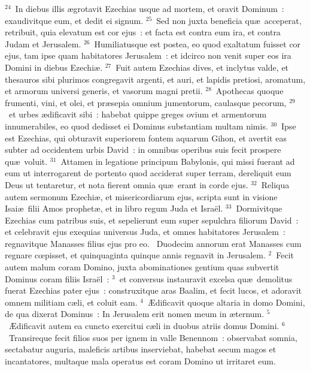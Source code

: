 ${}^{24}$~In diebus illis \ae grotavit Ezechias usque ad mortem, et oravit Dominum~: exaudivitque eum, et dedit ei signum.
${}^{25}$~Sed non juxta beneficia qu\ae\ acceperat, retribuit, quia elevatum est cor ejus~: et facta est contra eum ira, et contra Judam et Jerusalem.
${}^{26}$~Humiliatusque est postea, eo quod exaltatum fuisset cor ejus, tam ipse quam habitatores Jerusalem~: et idcirco non venit super eos ira Domini in diebus Ezechi\ae .
${}^{27}$~Fuit autem Ezechias dives, et inclytus valde, et thesauros sibi plurimos congregavit argenti, et auri, et lapidis pretiosi, aromatum, et armorum universi generis, et vasorum magni pretii.
${}^{28}$~Apothecas quoque frumenti, vini, et olei, et pr\ae sepia omnium jumentorum, caulasque pecorum,
${}^{29}$~et urbes \ae dificavit sibi~: habebat quippe greges ovium et armentorum innumerabiles, eo quod dedisset ei Dominus substantiam multam nimis.
${}^{30}$~Ipse est Ezechias, qui obturavit superiorem fontem aquarum Gihon, et avertit eas subter ad occidentem urbis David~: in omnibus operibus suis fecit prospere qu\ae\ voluit.
${}^{31}$~Attamen in legatione principum Babylonis, qui missi fuerant ad eum ut interrogarent de portento quod acciderat super terram, dereliquit eum Deus ut tentaretur, et nota fierent omnia qu\ae\ erant in corde ejus.
${}^{32}$~Reliqua autem sermonum Ezechi\ae , et misericordiarum ejus, scripta sunt in visione Isai\ae\ filii Amos prophet\ae , et in libro regum Juda et Isra\"el.
${}^{33}$~Dormivitque Ezechias cum patribus suis, et sepelierunt eum super sepulchra filiorum David~: et celebravit ejus exequias universus Juda, et omnes habitatores Jerusalem~: regnavitque Manasses filius ejus pro eo.
~\lettrine[lines=10,image=true,loversize=0.05,lraise=-0.03]{D}{}uodecim annorum erat Manasses cum regnare cœpisset, et quinquaginta quinque annis regnavit in Jerusalem.
${}^{2}$~Fecit autem malum coram Domino, juxta abominationes gentium quas subvertit Dominus coram filiis Isra\"el~:
${}^{3}$~et conversus instauravit excelsa qu\ae\ demolitus fuerat Ezechias pater ejus~: construxitque aras Baalim, et fecit lucos, et adoravit omnem militiam c\ae li, et coluit eam.
${}^{4}$~\AE dificavit quoque altaria in domo Domini, de qua dixerat Dominus~: In Jerusalem erit nomen meum in \ae ternum.
${}^{5}$~\AE dificavit autem ea cuncto exercitui c\ae li in duobus atriis domus Domini.
${}^{6}$~Transireque fecit filios suos per ignem in valle Benennom~: observabat somnia, sectabatur auguria, maleficis artibus inserviebat, habebat secum magos et incantatores, multaque mala operatus est coram Domino ut irritaret eum.
